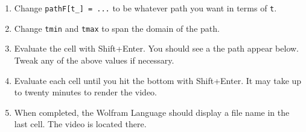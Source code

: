 \begin{enumerate}
\item Change \verb+pathF[t_] = ...+ to be whatever path you want in terms of \verb+t+.
\item Change \verb+tmin+ and \verb+tmax+ to span the domain of the path.
\item Evaluate the cell with Shift+Enter. You should see a the path appear below. Tweak any of the above values if necessary.
\item Evaluate each cell until you hit the bottom with Shift+Enter. It may take up to twenty minutes to render the video.
\item When completed, the Wolfram Language should display a file name in the last cell. The video is located there.
\end{enumerate}

